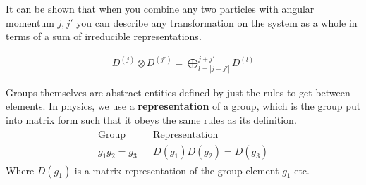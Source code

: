 It can be shown \cite{sakurai} that when you combine any two particles with angular momentum $j, j'$ you can describe any transformation on the system as a whole in terms of a sum of irreducible representations.

\begin{align}
D^{(j)}\otimes D^{(j')} = \bigoplus^{j+j'}_{l=|j-j'|} D^{(l)}
\end{align}

Groups themselves are abstract entities defined by just the rules to get between elements. In physics, we use a \textbf{representation} of a group, which is the group put into matrix form such that it obeys the same rules as its definition.
\begin{gather}
\begin{align}
\textrm{Group} && \textrm{Representation}\\
g_1g_2 = g_3 && D(g_1)D(g_2) = D(g_3)
\end{align}
\end{gather}
Where $D(g_1)$ is a matrix representation of the group element $g_1$ etc. 
